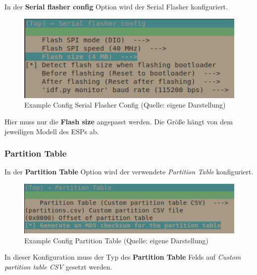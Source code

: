 In der \textbf{Serial flasher config} Option wird der Serial Flasher konfiguriert.

\begin{figure}[H]
    \begin{center}
        \includegraphics[scale=1]{images/example_config_serial_flasher_config.png}
        \caption{Example Config Serial Flasher Config (Quelle: eigene Darstellung)}
        \label{abb:example_config_serial_flasher_config}
    \end{center}
\end{figure}

Hier muss nur die \textbf{Flash size} angepasst werden. Die Größe hängt von dem jeweiligen Modell des ESPs ab.

\subsubsection{Partition Table}\label{sec:example-partition-table}

In der \textbf{Partition Table} Option wird der verwendete \textit{Partition Table} konfiguriert.

\begin{figure}[H]
    \begin{center}
        \includegraphics[scale=1]{images/example_config_partition_table.png}
        \caption{Example Config Partition Table (Quelle: eigene Darstellung)}
        \label{abb:example_config_partition_table}
    \end{center}
\end{figure}

In dieser Konfiguration muss der Typ des \textbf{Partition Table} Felds auf \textit{Custom partition table CSV} gesetzt werden.

